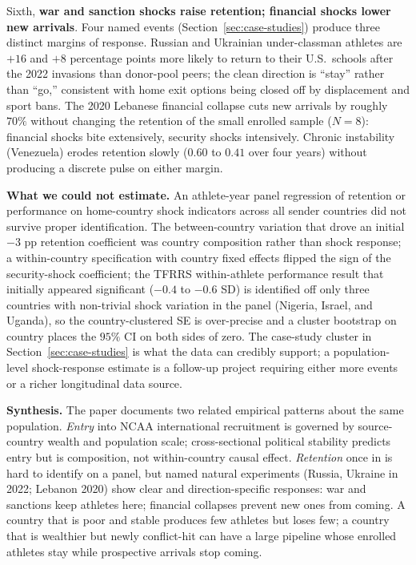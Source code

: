 \documentclass[11pt]{article}
\begin{document}
Sixth, \textbf{war and sanction shocks raise retention; financial
shocks lower new arrivals}. Four named events
(Section~\ref{sec:case-studies}) produce three distinct margins of
response. Russian and Ukrainian under-classman athletes are
$+16$ and $+8$ percentage points more likely to return to their
U.S.\ schools after the 2022 invasions than donor-pool peers; the
clean direction is ``stay'' rather than ``go,'' consistent with
home exit options being closed off by displacement and sport bans.
The 2020 Lebanese financial collapse cuts new arrivals by roughly
$70\%$ without changing the retention of the small enrolled sample
($N{=}8$): financial shocks bite extensively, security shocks
intensively. Chronic instability (Venezuela) erodes retention
slowly ($0.60$ to $0.41$ over four years) without producing a
discrete pulse on either margin.

\textbf{What we could not estimate.} An athlete-year panel regression
of retention or performance on home-country shock indicators across
all sender countries did not survive proper identification. The
between-country variation that drove an initial $-3$ pp retention
coefficient was country composition rather than shock response; a
within-country specification with country fixed effects flipped the
sign of the security-shock coefficient; the TFRRS within-athlete
performance result that initially appeared significant ($-0.4$ to
$-0.6$ SD) is identified off only three countries with non-trivial
shock variation in the panel (Nigeria, Israel, and Uganda), so the
country-clustered SE is over-precise and a cluster bootstrap on
country places the $95\%$ CI on both sides of zero. The case-study cluster in
Section~\ref{sec:case-studies} is what the data can credibly
support; a population-level shock-response estimate is a follow-up
project requiring either more events or a richer longitudinal data
source.

\textbf{Synthesis.} The paper documents two related empirical
patterns about the same population. \textit{Entry} into NCAA
international recruitment is governed by source-country wealth and
population scale; cross-sectional political stability predicts
entry but is composition, not within-country causal effect.
\textit{Retention} once in is hard to identify on a panel, but
named natural experiments (Russia, Ukraine in 2022; Lebanon 2020)
show clear and direction-specific responses: war and sanctions
keep athletes here; financial collapses prevent new ones from
coming. A country that is poor and stable produces few athletes
but loses few; a country that is wealthier but newly conflict-hit
can have a large pipeline whose enrolled athletes stay while
prospective arrivals stop coming.
\end{document}
